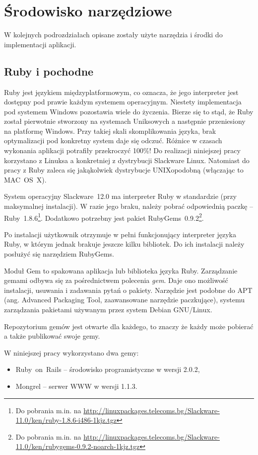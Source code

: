 \documentclass[a4paper,12pt,oneside]{report}
\begin{document}
\section{Środowisko narzędziowe}
\label{sec:srodowisko}
W kolejnych podrozdziałach opisane zostały użyte narzędzia i środki do implementacji aplikacji.

\subsection{Ruby i pochodne}
\label{sub:ruby-etc}
Ruby jest językiem międzyplatformowym, co oznacza, że jego interpreter jest dostępny pod prawie każdym systemem operacyjnym. Niestety implementacja pod systemem Windows pozostawia wiele do życzenia. Bierze się to stąd, że Ruby został pierwotnie stworzony na systemach Uniksowych a następnie przeniesiony na platformę Windows. Przy takiej skali skomplikowania języka, brak optymalizacji pod konkretny system daje się odczuć. Różnice w czasach wykonania aplikacji potrafiły przekroczyć 100\%! Do realizacji niniejszej pracy korzystano z Linuksa a konkretniej z dystrybucji Slackware Linux. Natomiast do pracy z Ruby zaleca się jakąkolwiek dystrybucje UNIXopodobną (włączając to MAC~OS~X).

System operacyjny Slackware~12.0 ma interpreter Ruby w standardzie (przy maksymalnej instalacji). W razie jego braku, należy pobrać odpowiednią paczkę -- Ruby~1.8.6\footnote{Do pobrania m.in. na \url{http://linuxpackages.telecoms.bg/Slackware-11.0/ken/ruby-1.8.6-i486-1kjz.tgz}}. Dodatkowo potrzebny jest pakiet RubyGems~0.9.2\footnote{Do pobrania m.in. na \url{http://linuxpackages.telecoms.bg/Slackware-11.0/ken/rubygems-0.9.2-noarch-1kjz.tgz}}.

Po instalacji użytkownik otrzymuje w pełni funkcjonujący interpreter języka Ruby, w którym jednak brakuje jeszcze kilku bibliotek. Do ich instalacji należy posłużyć się narzędziem RubyGems.

Moduł Gem to spakowana aplikacja lub biblioteka języka Ruby. Zarządzanie gemami odbywa się za pośrednictwem polecenia \emph{gem}. Daje ono możliwość instalacji, usuwania i zadawania pytań o pakiety. Narzędzie jest podobne do APT (ang. Advanced Packaging Tool, zaawansowane narzędzie paczkujące), systemu zarządzania pakietami używanym przez system Debian GNU/Linux.

Repozytorium gemów jest otwarte dla każdego, to znaczy że każdy może pobierać a także publikować swoje gemy.

W niniejszej pracy wykorzystano dwa gemy:
\begin{itemize}
  \item Ruby~on~Rails -- środowisko programistyczne w wersji 2.0.2,
  \item Mongrel -- serwer WWW w wersji 1.1.3.
\end{itemize}
\end{document}
